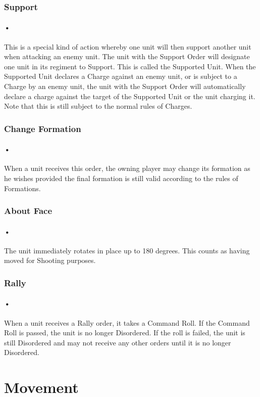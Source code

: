 \documentclass{article}
\begin{document}
\subsubsection{Support}
\paragraph{•}
This is a special kind of action whereby one unit will then support another unit when attacking an enemy unit. The unit with the Support Order will designate one unit in its regiment to Support. This is called the Supported Unit. When the Supported Unit declares a Charge against an enemy unit, or is subject to a Charge by an enemy unit, the unit with the Support Order will automatically declare a charge against the target of the Supported Unit or the unit charging it. Note that this is still subject to the normal rules of Charges.

\subsubsection{Change Formation}
\paragraph{•}
When a unit receives this order, the owning player may change its formation as he wishes provided the final formation is still valid according to the rules of Formations. 
\subsubsection{About Face}
\paragraph{•}
The unit immediately rotates in place up to 180 degrees. This counts as having moved for Shooting purposes.
\subsubsection{Rally}
\paragraph{•}
When a unit receives a Rally order, it takes a Command Roll. If the Command Roll is passed, the unit is no longer Disordered. If the roll is failed, the unit is still Disordered and may not receive any other orders until it is no longer Disordered.

\section{Movement}
\end{document}
